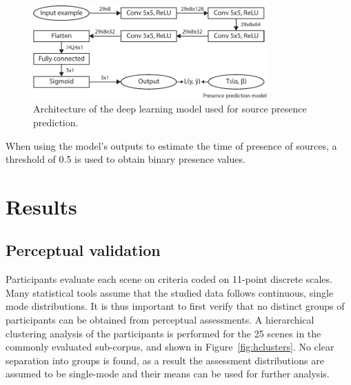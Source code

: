 \documentclass[11pt,a4paper]{article}
\begin{document}
\begin{figure}[!h]
    \centering
    \includegraphics[width=0.8\textwidth]{figures/deep_arch.pdf}
    \caption{Architecture of the deep learning model used for source presence prediction.}\label{fig:deep_arch}
\end{figure}

When using the model's outputs to estimate the time of presence of sources, a threshold of 0.5 is used to obtain binary presence values.

\section{Results}
\label{sec:results}

\subsection{Perceptual validation}
\label{sec:perc}

Participants evaluate each scene on criteria coded on 11-point discrete scales. Many statistical tools assume that the studied data follows continuous, single mode distributions. It is thus important to first verify that no distinct groups of participants can be obtained from perceptual assessments. A hierarchical clustering analysis of the participants is performed for the 25 scenes in the commonly evaluated sub-corpus, and shown in Figure~\ref{fig:hclusters}. No clear separation into groups is found, as a result the assessment distributions are assumed to be single-mode and their means can be used for further analysis.\\
\end{document}
